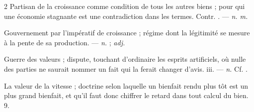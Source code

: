\begin{multicols}{2}
 Partisan de la croissance comme condition de tous les autres biens ; pour qui une économie stagnante est une contradiction dans les termes. Contr. . —  \textit{n. m.}

 Gouvernement par l'impératif de croissance ; régime dont la légitimité se mesure à la pente de sa production. —  \textit{n.} ;  \textit{adj.}

 Guerre des valeurs ; dispute, touchant d'ordinaire les esprits artificiels, où nulle des parties ne saurait nommer un fait qui la ferait changer d'avis.   iii. —  \textit{n.} Cf. .

 La valeur de la vitesse ; doctrine selon laquelle un bienfait rendu plus tôt est un plus grand bienfait, et qu'il faut donc chiffrer le retard dans tout calcul du bien.   9.

\end{multicols}

